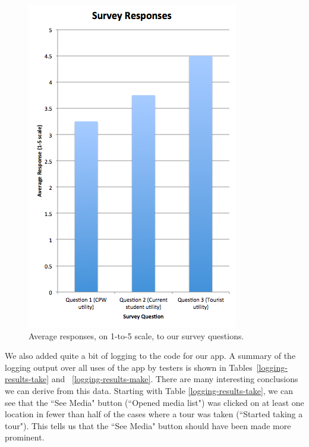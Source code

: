 \documentclass{sigchi}
\begin{document}
\begin{figure}
\centering
\includegraphics[width=1.0\linewidth]{./survey-responses.png}
\caption{Average responses, on 1-to-5 scale, to our survey questions.}
\label{survey-results}
\end{figure}

We also added quite a bit of logging to the code for our app. A summary of the logging output over all uses of the app by testers is shown in Tables~\ref{logging-results-take} and ~\ref{logging-results-make}. There are many interesting conclusions we can derive from this data. Starting with Table \ref{logging-results-take}, we can see that the ``See Media" button (``Opened media list") was clicked on at least one location in fewer than half of the cases where a tour was taken (``Started taking a tour"). This tells us that the ``See Media" button should have been made more prominent.
\end{document}
